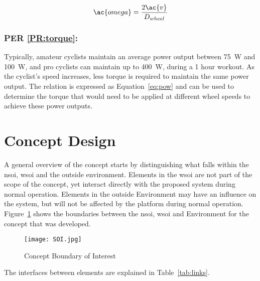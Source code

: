 \begin{equation}
	\ac{omega} = \frac{2 \ac{v}}{D_{wheel}}
	\label{eq:omega}
\end{equation}

\subsubsection{PER \ref{PR:torque}:}

Typically, amateur cyclists maintain an average power output between \SI{75}{\watt} and \SI{100}{\watt}, and pro cyclists can maintain up to \SI{400}{\watt}, during a 1 hour workout. As the cyclist's speed increases, less torque is required to maintain the same power output. The relation is expressed as Equation~\ref{eq:pow} and can be used to determine the torque that would need to be applied at different wheel speeds to achieve these power outputs.

\section{Concept Design}
\label{sec:conc}

A general overview of the concept starts by distinguishing what falls within the \acf{nsoi}, \acf{wsoi} and the outside environment. Elements in the \ac{wsoi} are not part of the scope of the concept, yet interact directly with the proposed system during normal operation. Elements in the outside Environment may have an influence on the system, but will not be affected by the platform during normal operation. Figure~\ref{fig:soi} shows the boundaries between the \ac{nsoi}, \ac{wsoi} and Environment for the concept that was developed.

\begin{figure}[H]
	\begin{center}
		\texttt{[image: SOI.jpg]}
		\caption{Concept Boundary of Interest}
		\label{fig:soi}
	\end{center}
\end{figure}

The interfaces between elements are explained in Table~\ref{tab:links}.


